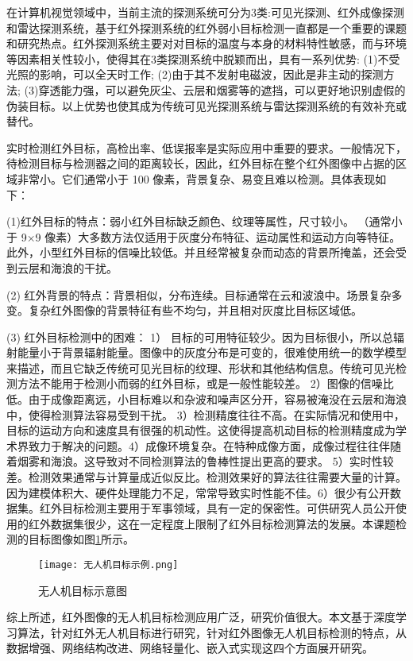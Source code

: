 在计算机视觉领域中，当前主流的探测系统可分为3类:可见光探测、红外成像探测和雷达探测系统，基于红外探测系统的红外弱小目标检测一直都是一个重要的课题和研究热点。红外探测系统主要对对目标的温度与本身的材料特性敏感，而与环境等因素相关性较小，使得其在3类探测系统中脱颖而出，具有一系列优势:
(1)不受光照的影响，可以全天时工作;
(2)由于其不发射电磁波，因此是非主动的探测方法;
(3)穿透能力强，可以避免灰尘、云层和烟雾等的遮挡，可以更好地识别虚假的伪装目标。以上优势也使其成为传统可见光探测系统与雷达探测系统的有效补充或替代。

实时检测红外目标，高检出率、低误报率是实际应用中重要的要求。一般情况下，待检测目标与检测器之间的距离较长，因此，红外目标在整个红外图像中占据的区域非常小。它们通常小于 100 像素，背景复杂、易变且难以检测。具体表现如下：

(1)红外目标的特点：弱小红外目标缺乏颜色、纹理等属性，尺寸较小。 （通常小于 9×9 像素）大多数方法仅适用于灰度分布特征、运动属性和运动方向等特征。此外，小型红外目标的信噪比较低。并且经常被复杂而动态的背景所掩盖，还会受到云层和海浪的干扰。

(2) 红外背景的特点：背景相似，分布连续。目标通常在云和波浪中。场景复杂多变。复杂红外图像的背景特征有些不均匀，并且相对灰度比目标区域低。

(3) 红外目标检测中的困难： 1） 目标的可用特征较少。因为目标很小，所以总辐射能量小于背景辐射能量。图像中的灰度分布是可变的，很难使用统一的数学模型来描述，而且它缺乏传统可见光目标的纹理、形状和其他结构信息。传统可见光检测方法不能用于检测小而弱的红外目标，或是一般性能较差。 2）图像的信噪比低。由于成像距离远，小目标难以和杂波和噪声区分开，容易被淹没在云层和海浪中，使得检测算法容易受到干扰。 3）检测精度往往不高。在实际情况和使用中，目标的运动方向和速度具有很强的机动性。这使得提高机动目标的检测精度成为学术界致力于解决的问题。4）成像环境复杂。在特种成像方面，成像过程往往伴随着烟雾和海浪。这导致对不同检测算法的鲁棒性提出更高的要求。 5）实时性较差。检测效果通常与计算量成近似反比。检测效果好的算法往往需要大量的计算。因为建模体积大、硬件处理能力不足，常常导致实时性能不佳。6）很少有公开数据集。红外目标检测主要用于军事领域，具有一定的保密性。可供研究人员公开使用的红外数据集很少，这在一定程度上限制了红外目标检测算法的发展。本课题检测的目标图像如图\ref{uav}所示。

\begin{figure}[htbp]
    \centering
    \texttt{[image: 无人机目标示例.png]}
    \caption{无人机目标示意图}
    \label{uav}
\end{figure}

综上所述，红外图像的无人机目标检测应用广泛，研究价值很大。本文基于深度学习算法，针对红外无人机目标进行研究，针对红外图像无人机目标检测的特点，从数据增强、网络结构改进、网络轻量化、嵌入式实现这四个方面展开研究。

